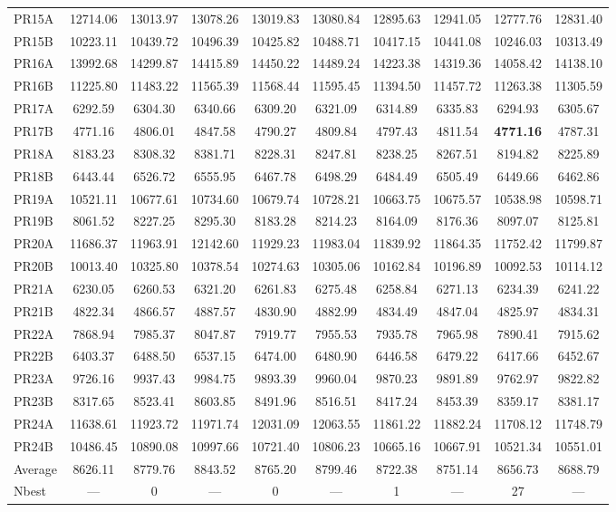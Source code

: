\documentclass{setp-new}
\begin{document}
\begin{longtable}{@{\extracolsep{\fill}}lccccccccc@{}}
    PR15A & 12714.06 & 13013.97 & 13078.26 & 13019.83 & 13080.84 & 12895.63 & 12941.05 & 12777.76 & 12831.40\\
    PR15B & 10223.11 & 10439.72 & 10496.39 & 10425.82 & 10488.71 & 10417.15 & 10441.08 & 10246.03 & 10313.49\\
    PR16A & 13992.68 & 14299.87 & 14415.89 & 14450.22 & 14489.24 & 14223.38 & 14319.36 & 14058.42 & 14138.10\\
    PR16B & 11225.80 & 11483.22 & 11565.39 & 11568.44 & 11595.45 & 11394.50 & 11457.72 & 11263.38 & 11305.59\\
    PR17A & 6292.59 & 6304.30 & 6340.66 & 6309.20 & 6321.09 & 6314.89 & 6335.83 & 6294.93 & 6305.67\\
    PR17B & 4771.16 & 4806.01 & 4847.58 & 4790.27 & 4809.84 & 4797.43 & 4811.54 & \textbf{4771.16} & 4787.31\\
    PR18A & 8183.23 & 8308.32 & 8381.71 & 8228.31 & 8247.81 & 8238.25 & 8267.51 & 8194.82 & 8225.89\\
    PR18B & 6443.44 & 6526.72 & 6555.95 & 6467.78 & 6498.29 & 6484.49 & 6505.49 & 6449.66 & 6462.86\\
    PR19A & 10521.11 & 10677.61 & 10734.60 & 10679.74 & 10728.21 & 10663.75 & 10675.57 & 10538.98 & 10598.71\\
    PR19B & 8061.52 & 8227.25 & 8295.30 & 8183.28 & 8214.23 & 8164.09 & 8176.36 & 8097.07 & 8125.81\\
    PR20A & 11686.37 & 11963.91 & 12142.60 & 11929.23 & 11983.04 & 11839.92 & 11864.35 & 11752.42 & 11799.87\\
    PR20B & 10013.40 & 10325.80 & 10378.54 & 10274.63 & 10305.06 & 10162.84 & 10196.89 & 10092.53 & 10114.12\\
    PR21A & 6230.05 & 6260.53 & 6321.20 & 6261.83 & 6275.48 & 6258.84 & 6271.13 & 6234.39 & 6241.22\\
    PR21B & 4822.34 & 4866.57 & 4887.57 & 4830.90 & 4882.99 & 4834.49 & 4847.04 & 4825.97 & 4834.31\\
    PR22A & 7868.94 & 7985.37 & 8047.87 & 7919.77 & 7955.53 & 7935.78 & 7965.98 & 7890.41 & 7915.62\\
    PR22B & 6403.37 & 6488.50 & 6537.15 & 6474.00 & 6480.90 & 6446.58 & 6479.22 & 6417.66 & 6452.67\\
    PR23A & 9726.16 & 9937.43 & 9984.75 & 9893.39 & 9960.04 & 9870.23 & 9891.89 & 9762.97 & 9822.82\\
    PR23B & 8317.65 & 8523.41 & 8603.85 & 8491.96 & 8516.51 & 8417.24 & 8453.39 & 8359.17 & 8381.17\\
    PR24A & 11638.61 & 11923.72 & 11971.74 & 12031.09 & 12063.55 & 11861.22 & 11882.24 & 11708.12 & 11748.79\\
    PR24B & 10486.45 & 10890.08 & 10997.66 & 10721.40 & 10806.23 & 10665.16 & 10667.91 & 10521.34 & 10551.01\\
    Average & 8626.11 & 8779.76 & 8843.52 & 8765.20 & 8799.46 & 8722.38 & 8751.14 & 8656.73 & 8688.79\\
    Nbest & --- & 0 & --- & 0 & --- & 1 & --- & 27 & ---\\
\end{longtable}
\endgroup
\end{document}
